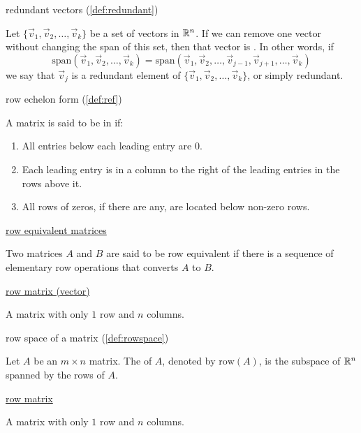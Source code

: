 \documentclass{ximera}
\begin{document}
redundant vectors (\ref{def:redundant})
\begin{expandable}{}{}
    Let $\{\vec{v}_1,\vec{v}_2,\dots,\vec{v}_k\}$ be a set of vectors in $\mathbb{R}^n$.  If we can remove one vector without changing the span of this set, then that vector is .  In other words, if $$\mbox{span}\left(\vec{v}_1,\vec{v}_2,\dots,\vec{v}_k\right)=\mbox{span}\left(\vec{v}_1,\vec{v}_2,\dots,\vec{v}_{j-1},\vec{v}_{j+1},\dots,\vec{v}_k\right)$$ we say that $\vec{v}_j$ is a redundant element of $\{\vec{v}_1,\vec{v}_2,\dots,\vec{v}_k\}$, or simply redundant.
\end{expandable}


row echelon form (\ref{def:ref})
\begin{expandable}{}{}
    A matrix is said to be in  if:
\begin{enumerate}
\item All entries below each leading entry are 0.
\item Each leading entry is in a column to the right of the leading entries in the rows above it.
\item All rows of zeros, if there are any, are located below non-zero rows.
\end{enumerate}
\end{expandable}

\href{https://ximera.osu.edu/linearalgebradzv3/LinearAlgebraInteractiveIntro/SYS-0020/main}{row equivalent matrices}
\begin{expandable}{}{}
    Two matrices $A$ and $B$ are said to be row equivalent if there is a sequence of elementary row operations that converts $A$ to $B$.
\end{expandable}

\href{https://ximera.osu.edu/linearalgebradzv3/LinearAlgebraInteractiveIntro/MAT-0010/main}{row matrix (vector)}
\begin{expandable}{}{}
    A matrix with only $1$ row and $n$ columns.
\end{expandable}

row space of a matrix (\ref{def:rowspace})
\begin{expandable}{}{}
    Let $A$ be an $m\times n$ matrix.  The  of $A$, denoted by $\mbox{row}(A)$, is the subspace of $\mathbb{R}^n$ spanned by the rows of $A$.
\end{expandable}


\href{https://ximera.osu.edu/linearalgebradzv3/LinearAlgebraInteractiveIntro/MAT-0010/main}{row matrix}
\begin{expandable}{}{}
    A matrix with only $1$ row and $n$ columns.
\end{expandable}
\end{document}
